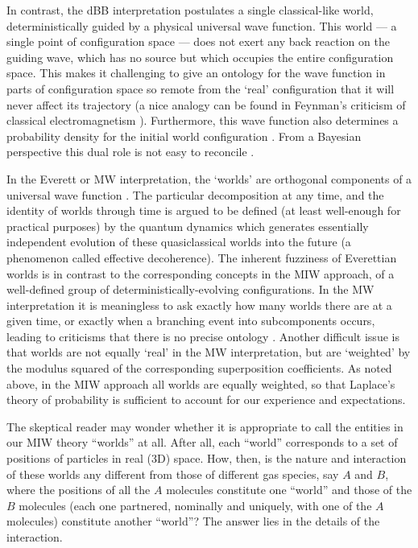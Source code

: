 \documentclass[twocolumn,aps,pra,amsmath,amssymb,superscriptaddress]{revtex4}
\renewcommand{\(}{\left(}
\renewcommand{\)}{\right)}
\newcommand{\red}{\color{red}}
\newcommand{\blk}{\color{black}}
\renewcommand\red{\blk}
\begin{document}
In contrast, the dBB interpretation postulates a single \red classical-like \blk world, deterministically
guided by a physical \red universal \blk wave function.  This world \red --- a single
point of configuration space --- \blk does not exert any back reaction on the
guiding wave, which has no source but which occupies the entire configuration
space. This  makes it \red challenging \blk to give an ontology for the wave function in
parts of configuration space so remote from the `real' configuration that it will
never affect \red its trajectory \blk (a nice analogy can be found in Feynman's criticism of classical
electromagnetism \cite{feynman}). 
Furthermore, \blk this wave function also
determines a probability density for the initial world configuration
\cite{dbb,hollandbook}.  From a Bayesian perspective this dual role is not easy to reconcile
\cite{wiseman07}.
 
In the \blk Everett or \blk MW interpretation, the `worlds' are orthogonal
components of a universal wave function \cite{mwi}. \blk The particular
decomposition at any time, and the identity of worlds through time is argued to
be defined (at least well-enough for practical purposes) by the quantum dynamics
which generates essentially independent evolution of these quasiclassical worlds
into the future (a phenomenon called effective decoherence). The inherent
fuzziness of Everettian worlds is in contrast to the
corresponding concepts in the MIW approach, of a  well-defined group \blk of
deterministically-evolving configurations. \blk In the MW interpretation \blk it
is meaningless to ask exactly how many worlds there are at a given time, or
exactly when a branching event into subcomponents occurs, leading to criticisms
that there is no precise ontology \cite{kent}.  Another \blk difficult issue
 is that worlds are not \blk equally `real' in the MW
interpretation, but are `weighted' by the \blk modulus squared of the \blk
corresponding superposition coefficients. \blk As noted above,  in the MIW
approach all worlds are equally weighted, so that Laplace's theory of
probability is sufficient to account for our experience and expectations. \blk  
 
 \red The skeptical reader may wonder whether it is appropriate to call 
 the entities in our MIW theory ``worlds'' at all. After all, each ``world'' corresponds 
 to a set of positions of particles in real (3D) space. How, then, is the nature and 
 interaction of these worlds any different from those of different gas species, say 
 $A$ and $B$, where the positions of all the $A$ molecules
 constitute one ``world'' and those of the $B$ molecules (each one partnered, 
 nominally and uniquely, with one of the $A$ molecules) 
constitute another ``world''? The answer lies in the details of the interaction.
 
\end{document}
